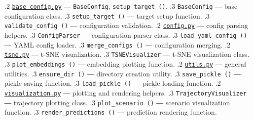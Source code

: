 {.2 \href{https://github.com/JanDuchscherer104/UniTraj/blob/main/unitraj/utils/base_config.py}{\texttt{base\_config.py}} ― \texttt{BaseConfig}, \texttt{setup\_target ()}.
.3 \texttt{BaseConfig} ― base configuration class.
.3 \texttt{setup\_target ()} ― target setup function.
.3 \texttt{validate\_config ()} ― configuration validation.
.2 \href{https://github.com/JanDuchscherer104/UniTraj/blob/main/unitraj/utils/config.py}{\texttt{config.py}} ― config parsing helpers.
.3 \texttt{ConfigParser} ― configuration parser class.
.3 \texttt{load\_yaml\_config ()} ― YAML config loader.
.3 \texttt{merge\_configs ()} ― configuration merging.
.2 \href{https://github.com/JanDuchscherer104/UniTraj/blob/main/unitraj/utils/tsne.py}{\texttt{tsne.py}} ― t-SNE visualization.
.3 \texttt{TSNEVisualizer} ― t-SNE visualization class.
.3 \texttt{plot\_embeddings ()} ― embedding plotting function.
.2 \href{https://github.com/JanDuchscherer104/UniTraj/blob/main/unitraj/utils/utils.py}{\texttt{utils.py}} ― general utilities.
.3 \texttt{ensure\_dir ()} ― directory creation utility.
.3 \texttt{save\_pickle ()} ― pickle saving function.
.3 \texttt{load\_pickle ()} ― pickle loading function.
.2 \href{https://github.com/JanDuchscherer104/UniTraj/blob/main/unitraj/utils/visualization.py}{\texttt{visualization.py}} ― plotting and rendering helpers.
.3 \texttt{TrajectoryVisualizer} ― trajectory plotting class.
.3 \texttt{plot\_scenario ()} ― scenario visualization function.
.3 \texttt{render\_predictions ()} ― prediction rendering function.
}


